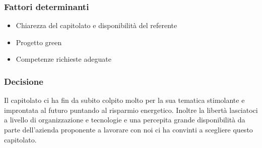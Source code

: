 \subsubsection{Fattori determinanti}
\begin{itemize}
    \item Chiarezza del capitolato e disponibilità del referente
    \item Progetto green
    \item Competenze richieste adeguate
\end{itemize}

\subsubsection{Decisione}
Il capitolato ci ha fin da subito colpito molto per la sua tematica stimolante e improntata al futuro puntando al risparmio energetico. Inoltre la libertà lasciatoci a livello di organizzazione e tecnologie e una 
percepita grande disponibilità da parte dell'azienda proponente a lavorare con noi ci ha convinti a scegliere questo capitolato.
